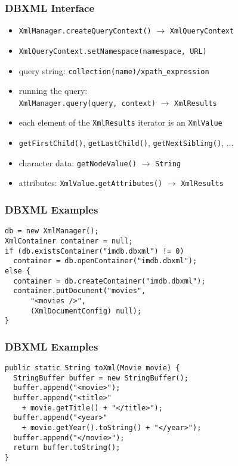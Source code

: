 \documentclass[dvipsnames]{beamer}
\theoremstyle{plain}
\begin{document}
\begin{frame}
  \frametitle{DBXML Interface}

  \begin{itemize}
    \item \lstinline!XmlManager.createQueryContext()!
      $\rightarrow$ \lstinline!XmlQueryContext!
    \item \lstinline!XmlQueryContext.setNamespace(namespace, URL)!

    \pause
    \item query string: \lstinline!collection(name)/xpath_expression!
    \item running the query:\\
      \lstinline!XmlManager.query(query, context)!
      $\rightarrow$ \lstinline!XmlResults!

    \pause
    \medskip
    \item each element of the \lstinline!XmlResults! iterator is an
      \lstinline!XmlValue!
    \item \lstinline!getFirstChild()!, \lstinline!getLastChild()!,
      \lstinline!getNextSibling()!, ...
    \item character data: \lstinline!getNodeValue()!
      $\rightarrow$ \lstinline!String!
    \item attributes:
      \lstinline!XmlValue.getAttributes()! $\rightarrow$ \lstinline!XmlResults!
  \end{itemize}
\end{frame}

\begin{frame}[fragile]
  \frametitle{DBXML Examples}

  \begin{example}
    \begin{lstlisting}
db = new XmlManager();
XmlContainer container = null;
if (db.existsContainer("imdb.dbxml") != 0)
  container = db.openContainer("imdb.dbxml");
else {
  container = db.createContainer("imdb.dbxml");
  container.putDocument("movies",
      "<movies />",
      (XmlDocumentConfig) null);
}
    \end{lstlisting}
  \end{example}
\end{frame}

\begin{frame}[fragile]
  \frametitle{DBXML Examples}

  \begin{example}
    \begin{lstlisting}
public static String toXml(Movie movie) {
  StringBuffer buffer = new StringBuffer();
  buffer.append("<movie>");
  buffer.append("<title>"
    + movie.getTitle() + "</title>");
  buffer.append("<year>"
    + movie.getYear().toString() + "</year>");
  buffer.append("</movie>");
  return buffer.toString();
}
    \end{lstlisting}
  \end{example}
\end{frame}
\end{document}
